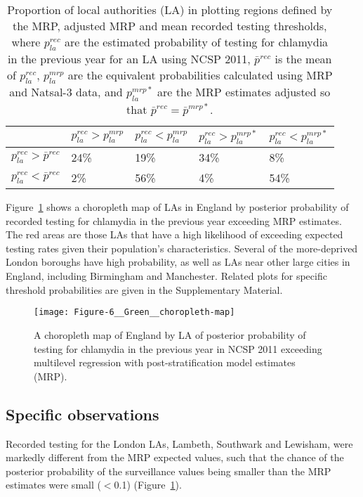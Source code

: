 \documentclass[fleqn,10pt]{wlscirep}
\begin{document}
\begin{table}[!ht]
\renewcommand*{\arraystretch}{1.5}
\centering
\begin{tabular}{|l|l|l|l|l|}
\hline 
 & $p_{la}^{rec} > p_{la}^{mrp}$
 & $p_{la}^{rec}< p_{la}^{mrp}$
 & $p_{la}^{rec} > p_{la}^{mrp*}$
 & $p_{la}^{rec}< p_{la}^{mrp*}$ \\
\hline
$p_{la}^{rec} > \bar{p}^{rec}$ & 24\% & 19\% & 34\% & 8\%\\
\hline
$p_{la}^{rec} < \bar{p}^{rec}$ & 2\% & 56\% & 4\% & 54\%\\
\hline
\end{tabular}
\caption{\label{tab:regions} Proportion of local authorities (LA) in plotting regions defined by the MRP, adjusted MRP and mean recorded testing thresholds, where $p_{la}^{rec}$ are the estimated probability of testing for chlamydia in the previous year for an LA using NCSP 2011, $\bar{p}^{rec}$ is the mean of $p_{la}^{rec}$, $p_{la}^{mrp}$ are the equivalent probabilities calculated using MRP and Natsal-3 data, and $p_{la}^{mrp*}$ are the MRP estimates adjusted so that $\bar{p}^{rec} = \bar{p}^{mrp*}$.}
\end{table}

Figure~\ref{fig:choropleth} shows a choropleth map of LAs in England by posterior probability of recorded testing for chlamydia in the previous year exceeding MRP estimates. The red areas are those LAs that have a high likelihood of exceeding expected testing rates given their population’s characteristics. Several of the more-deprived London boroughs have high probability, as well as LAs near other large cities in England, including Birmingham and Manchester. Related plots for specific threshold probabilities are given in the Supplementary Material.

\begin{figure}[!ht]
\centering
\texttt{[image: Figure-6\_\_Green\_\_choropleth-map]}
\caption{A choropleth map of England by LA of posterior probability of testing for chlamydia in the previous year in
NCSP 2011 exceeding multilevel regression with post-stratification model estimates (MRP).}
\label{fig:choropleth}
\end{figure}

\subsection*{Specific observations}
Recorded testing for the London LAs, Lambeth, Southwark and Lewisham, were markedly different from the MRP expected values, such that the chance of the posterior probability of the surveillance values being smaller than the MRP estimates were small ($<$0.1) (Figure~\ref{fig:choropleth}).
\end{document}
